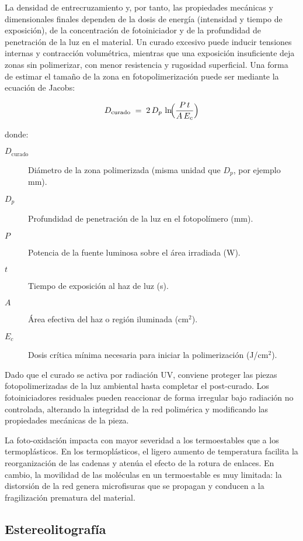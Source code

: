 La densidad de entrecruzamiento y, por tanto, las propiedades mecánicas y dimensionales finales dependen de la dosis de energía (intensidad y tiempo de exposición), de la concentración de fotoiniciador y de la profundidad de penetración de la luz en el material. Un curado excesivo puede inducir tensiones internas y contracción volumétrica, mientras que una exposición insuficiente deja zonas sin polimerizar, con menor resistencia y rugosidad superficial. Una forma de estimar el tamaño de la zona en fotopolimerización puede ser mediante la ecuación de Jacobs:

\begin{equation}
	D_{\mathrm{curado}} \;=\; 2\,D_{p}\,\ln\!\Bigl(\frac{P\,t}{A\,E_{c}}\Bigr)
\end{equation}

donde:

\begin{description}
	\item[$D_{\mathrm{curado}}$] Diámetro de la zona polimerizada (misma unidad que $D_{p}$, por ejemplo mm).
	\item[$D_{p}$] Profundidad de penetración de la luz en el fotopolímero (mm).
	\item[$P$] Potencia de la fuente luminosa sobre el área irradiada (W).
	\item[$t$] Tiempo de exposición al haz de luz (s).
	\item[$A$] Área efectiva del haz o región iluminada (cm$^2$).
	\item[$E_{c}$] Dosis crítica mínima necesaria para iniciar la polimerización (J/cm$^2$).
\end{description}

Dado que el curado se activa por radiación UV, conviene proteger las piezas fotopolimerizadas de la luz ambiental hasta completar el post-curado. Los fotoiniciadores residuales pueden reaccionar de forma irregular bajo radiación no controlada, alterando la integridad de la red polimérica y modificando las propiedades mecánicas de la pieza.

La foto-oxidación impacta con mayor severidad a los termoestables que a los termoplásticos. En los termoplásticos, el ligero aumento de temperatura facilita la reorganización de las cadenas y atenúa el efecto de la rotura de enlaces. En cambio, la movilidad de las moléculas en un termoestable es muy limitada: la distorsión de la red genera microfisuras que se propagan y conducen a la fragilización prematura del material.

\subsection{Estereolitografía}

